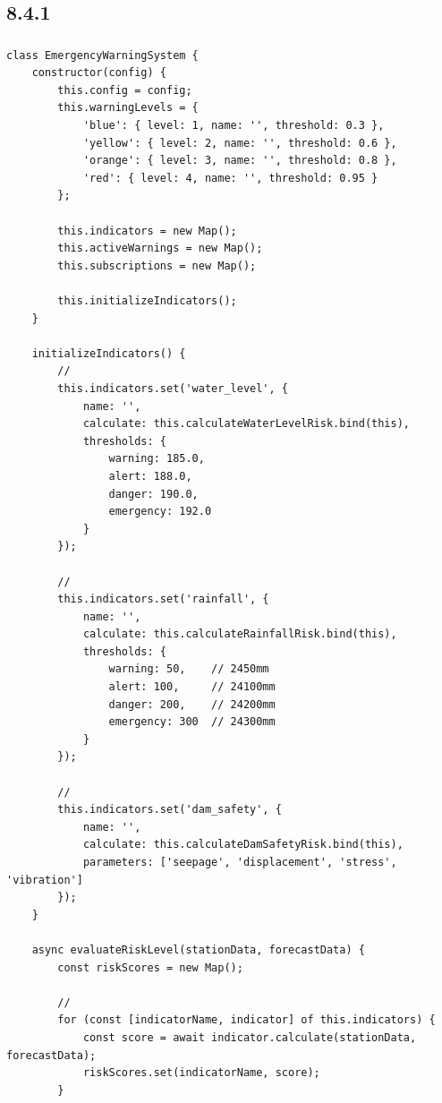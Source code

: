 \hypertarget{section-104}{%
\subsection{8.4.1}\label{section-104}}

\hypertarget{section-105}{%
\subsubsection{}\label{section-105}}

\begin{lstlisting}[style=javascript]
class EmergencyWarningSystem {
    constructor(config) {
        this.config = config;
        this.warningLevels = {
            'blue': { level: 1, name: '', threshold: 0.3 },
            'yellow': { level: 2, name: '', threshold: 0.6 },
            'orange': { level: 3, name: '', threshold: 0.8 },
            'red': { level: 4, name: '', threshold: 0.95 }
        };
        
        this.indicators = new Map();
        this.activeWarnings = new Map();
        this.subscriptions = new Map();
        
        this.initializeIndicators();
    }
    
    initializeIndicators() {
        // 
        this.indicators.set('water_level', {
            name: '',
            calculate: this.calculateWaterLevelRisk.bind(this),
            thresholds: {
                warning: 185.0,
                alert: 188.0,
                danger: 190.0,
                emergency: 192.0
            }
        });
        
        // 
        this.indicators.set('rainfall', {
            name: '',
            calculate: this.calculateRainfallRisk.bind(this),
            thresholds: {
                warning: 50,    // 2450mm
                alert: 100,     // 24100mm
                danger: 200,    // 24200mm
                emergency: 300  // 24300mm
            }
        });
        
        // 
        this.indicators.set('dam_safety', {
            name: '',
            calculate: this.calculateDamSafetyRisk.bind(this),
            parameters: ['seepage', 'displacement', 'stress', 'vibration']
        });
    }
    
    async evaluateRiskLevel(stationData, forecastData) {
        const riskScores = new Map();
        
        // 
        for (const [indicatorName, indicator] of this.indicators) {
            const score = await indicator.calculate(stationData, forecastData);
            riskScores.set(indicatorName, score);
        }
        

\end{lstlisting}
